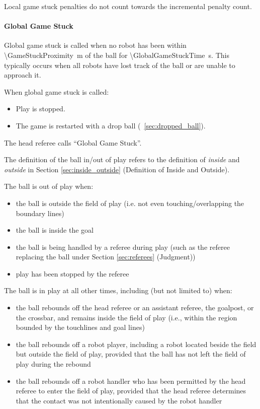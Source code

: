 Local game stuck penalties do not count towards the incremental penalty count.

\paragraph{Global Game Stuck}
\label{sec:global_game_stuck}

Global game stuck is called when no robot has been within \qty{\GameStuckProximity}{\metre} of the ball for \qty{\GlobalGameStuckTime}{\second}. This typically occurs when all robots have lost track of the ball or are unable to approach it.

When global game stuck is called:
\begin{itemize}
  \item Play is stopped.
  \item The game is restarted with a drop ball (\cf~\cref{sec:dropped_ball}).
\end{itemize}

The head referee calls ``Global Game Stuck''.

\label{sec:ball_in_out_play}

The definition of the ball in/out of play refers to the definition of \textit{inside} and \textit{outside} in Section \ref{sec:inside_outside} (Definition of Inside and Outside).

The ball is out of play when:
\begin{itemize}
	\item the ball is outside the field of play (i.e. not even touching/overlapping the boundary lines)
	\item the ball is inside the goal
	\item the ball is being handled by a referee during play (such as the referee replacing the ball under Section \ref{sec:referees} (Judgment)) 
	\item play has been stopped by the referee
\end{itemize}

The ball is in play at all other times, including (but not limited to) when:
\begin{itemize}
	\item the ball rebounds off the head referee or an assistant referee, the goalpost, or the crossbar, and remains inside the field of play (i.e., within the region bounded by the touchlines and goal lines)
	\item the ball rebounds off a robot player, including a robot located beside the field but outside the field of play, provided that the ball has not left the field of play during the rebound
	\item the ball rebounds off a robot handler who has been permitted by the head referee to enter the field of play, provided that the head referee determines that the contact was not intentionally caused by the robot handler
\end{itemize}

